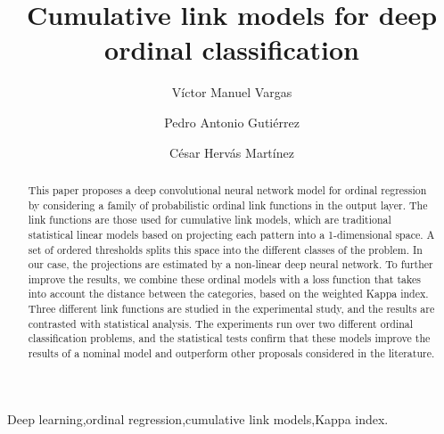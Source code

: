 \documentclass[preprint]{elsarticle}
\begin{document}
\begin{frontmatter}

\title{Cumulative link models for deep ordinal classification}

\author{V\'ictor Manuel Vargas}
\author{Pedro Antonio Guti\'errez}
\author{C\'esar Herv\'as Mart\'inez}
\address{Department of Computer Science and Numerical Analysis, University of C\'ordoba, C\'ordoba, Spain}

\begin{abstract}
	This paper proposes a deep convolutional neural network model for ordinal regression by considering a family of probabilistic ordinal link functions in the output layer. The link functions are those used for cumulative link models, which are traditional statistical linear models based on projecting each pattern into a 1-dimensional space. A set of ordered thresholds splits this space into the different classes of the problem. In our case, the projections are estimated by a non-linear deep neural network. To further improve the results, we combine these ordinal models with a loss function that takes into account the distance between the categories, based on the weighted Kappa index. Three different link functions are studied in the experimental study, and the results are contrasted with statistical analysis. The experiments run over two different ordinal classification problems, and the statistical tests confirm that these models improve the results of a nominal model and outperform other proposals considered in the literature.
\end{abstract}

\begin{keyword}
Deep learning\sep ordinal regression\sep cumulative link models\sep Kappa index.
\end{keyword}

\end{frontmatter}

\end{document}
